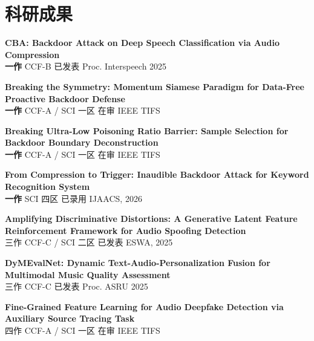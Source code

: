 \documentclass[a4paper,10pt]{article}
\begin{document}

\section{科研成果}

\vspace{2pt}
\begin{enumerate}[leftmargin=*, after=\strut, label={[\arabic*]}]

    \item \textbf{CBA: Backdoor Attack on Deep Speech Classification via Audio Compression}\\
    {\small \textbf{一作} \quad CCF-B \quad 已发表 \quad Proc. Interspeech 2025}

    \item \textbf{Breaking the Symmetry: Momentum Siamese Paradigm for Data-Free Proactive Backdoor Defense}\\
    {\small \textbf{一作} \quad CCF-A / SCI 一区 \quad 在审 \quad IEEE TIFS}

    \item \textbf{Breaking Ultra-Low Poisoning Ratio Barrier: Sample Selection for Backdoor Boundary Deconstruction}\\
    {\small \textbf{一作} \quad CCF-A / SCI 一区 \quad 在审 \quad IEEE TIFS}

    \item \textbf{From Compression to Trigger: Inaudible Backdoor Attack for Keyword Recognition System}\\
    {\small \textbf{一作} \quad SCI 四区 \quad 已录用 \quad IJAACS, 2026}

    \item \textbf{Amplifying Discriminative Distortions: A Generative Latent Feature Reinforcement Framework for Audio Spoofing Detection}\\
    {\small 三作 \quad CCF-C / SCI 二区 \quad 已发表 \quad ESWA, 2025}

    \item \textbf{DyMEvalNet: Dynamic Text-Audio-Personalization Fusion for Multimodal Music Quality Assessment}\\
    {\small 三作 \quad CCF-C \quad 已发表 \quad Proc. ASRU 2025}

    \item \textbf{Fine-Grained Feature Learning for Audio Deepfake Detection via Auxiliary Source Tracing Task}\\
    {\small 四作 \quad CCF-A / SCI 一区 \quad 在审 \quad IEEE TIFS}


\end{enumerate}
\end{document}
